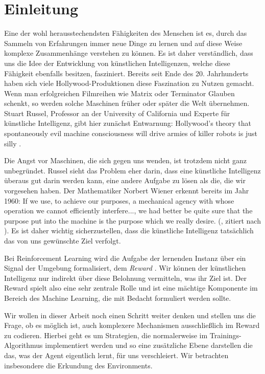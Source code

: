 \chapter{Einleitung} \label{sec:introduction}
Eine der wohl herausstechendsten Fähigkeiten des Menschen ist es, durch das Sammeln von Erfahrungen immer neue Dinge zu lernen und auf diese Weise komplexe Zusammenhänge verstehen zu können. Es ist daher verständlich, dass uns die Idee der Entwicklung von künstlichen Intelligenzen, welche diese Fähigkeit ebenfalls besitzen, fasziniert. Bereits seit Ende des 20. Jahrhunderts haben sich viele Hollywood-Produktionen diese Faszination zu Nutzen gemacht. Wenn man erfolgreichen Filmreihen wie \glqq Matrix\grqq{} oder \glqq Terminator\grqq{} Glauben schenkt, so werden solche Maschinen früher oder später die Welt übernehmen. Stuart Russel, Professor an der University of California und Experte für künstliche Intelligenz, gibt hier zunächst Entwarnung: \glqq Hollywood's theory that spontaneously evil machine consciousness will drive armies of killer robots is just silly\grqq{} \cite{14_russell2016should}.

Die Angst vor Maschinen, die sich gegen uns wenden, ist trotzdem nicht ganz unbegründet. Russel sieht das Problem eher darin, dass eine künstliche Intelligenz überaus gut darin werden kann, eine andere Aufgabe zu lösen als die, die wir vorgesehen haben. Der Mathematiker Norbert Wiener erkennt bereits im Jahr 1960: \glqq If we use, to achieve our purposes, a mechanical agency with whose operation we cannot efficiently interfere..., we had better be quite sure that the purpose put into the machine is the purpose which we really desire.\grqq{} (\cite{14-2_wiener1960some}, zitiert nach \cite{14_russell2016should}). Es ist daher wichtig sicherzustellen, dass die künstliche Intelligenz tatsächlich das von uns gewünschte Ziel verfolgt.

Bei Reinforcement Learning wird die Aufgabe der lernenden Instanz über ein Signal der Umgebung formalisiert, dem \textit{Reward} \cite{06_sutton2018reinforcement}. Wir können der künstlichen Intelligenz nur indirekt über diese Belohnung vermitteln, was ihr Ziel ist. Der Reward spielt also eine sehr zentrale Rolle und ist eine mächtige Komponente im Bereich des Machine Learning, die mit Bedacht formuliert werden sollte.

Wir wollen in dieser Arbeit noch einen Schritt weiter denken und stellen uns die Frage, ob es möglich ist, auch komplexere Mechanismen ausschließlich im Reward zu codieren. Hierbei geht es um Strategien, die normalerweise im Trainings-Algorithmus implementiert werden und so eine zusätzliche Ebene darstellen die das, was der Agent eigentlich lernt, für uns verschleiert. Wir betrachten insbesondere die Erkundung des Environments.

